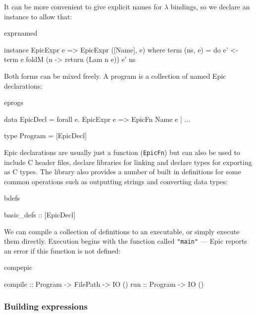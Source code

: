 It can be more convenient to give explicit names for $\lambda$
bindings, so we declare an instance to allow that:

\begin{SaveVerbatim}{exprnamed}

instance EpicExpr e => EpicExpr ([Name], e) where
    term (ns, e) = do 
        e' <- term e
        foldM (\e n -> return (Lam n e)) e' ns

\end{SaveVerbatim}

Both forms can be mixed freely.
A program is a collection of named Epic declarations:

\begin{SaveVerbatim}{eprogs}

data EpicDecl = forall e. EpicExpr e => EpicFn Name e
              | ...

type Program = [EpicDecl]

\end{SaveVerbatim}

\noindent
Epic declarations are usually just a function (\texttt{EpicFn}) but
can also be used to include C header files, declare libraries for
linking and declare types for exporting as C types. The library also
provides a number of built in definitions for some common operations
such as outputting strings and converting data types:

\begin{SaveVerbatim}{bdefs}

basic_defs :: [EpicDecl]

\end{SaveVerbatim}

We can compile a collection of definitions to an executable, or simply
execute them directly. Execution begins with the function called
\texttt{"main"} --- Epic reports an error if this function is not
defined:

\begin{SaveVerbatim}{compepic}

compile :: Program -> FilePath -> IO ()
run     :: Program -> IO ()

\end{SaveVerbatim}

\subsubsection*{Building expressions}

